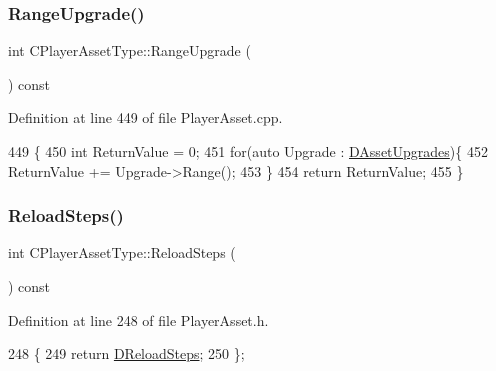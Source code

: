 \subsubsection{\texorpdfstring{Range\+Upgrade()}{RangeUpgrade()}}
{\footnotesize\ttfamily int C\+Player\+Asset\+Type\+::\+Range\+Upgrade (\begin{DoxyParamCaption}{ }\end{DoxyParamCaption}) const}



Definition at line 449 of file Player\+Asset.\+cpp.


\begin{DoxyCode}
449                                         \{
450     \textcolor{keywordtype}{int} ReturnValue = 0;
451     \textcolor{keywordflow}{for}(\textcolor{keyword}{auto} Upgrade : \hyperlink{classCPlayerAssetType_aeb8d5c3ea81ea56248d02a5e24d48001}{DAssetUpgrades})\{
452         ReturnValue += Upgrade->Range();
453     \}
454     \textcolor{keywordflow}{return} ReturnValue;
455 \}
\end{DoxyCode}
\hypertarget{classCPlayerAssetType_a2e6670a72cb6e48cc481ee398db2f2ab}{}\label{classCPlayerAssetType_a2e6670a72cb6e48cc481ee398db2f2ab} 
\subsubsection{\texorpdfstring{Reload\+Steps()}{ReloadSteps()}}
{\footnotesize\ttfamily int C\+Player\+Asset\+Type\+::\+Reload\+Steps (\begin{DoxyParamCaption}{ }\end{DoxyParamCaption}) const\hspace{0.3cm}{\ttfamily [inline]}}



Definition at line 248 of file Player\+Asset.\+h.


\begin{DoxyCode}
248                                \{
249             \textcolor{keywordflow}{return} \hyperlink{classCPlayerAssetType_a192d6ac421608663d18d1a0cda00841e}{DReloadSteps};  
250         \};
\end{DoxyCode}
\hypertarget{classCPlayerAssetType_a87e2ba8eecf6877a42fb9f31df4248bb}{}\label{classCPlayerAssetType_a87e2ba8eecf6877a42fb9f31df4248bb} 
